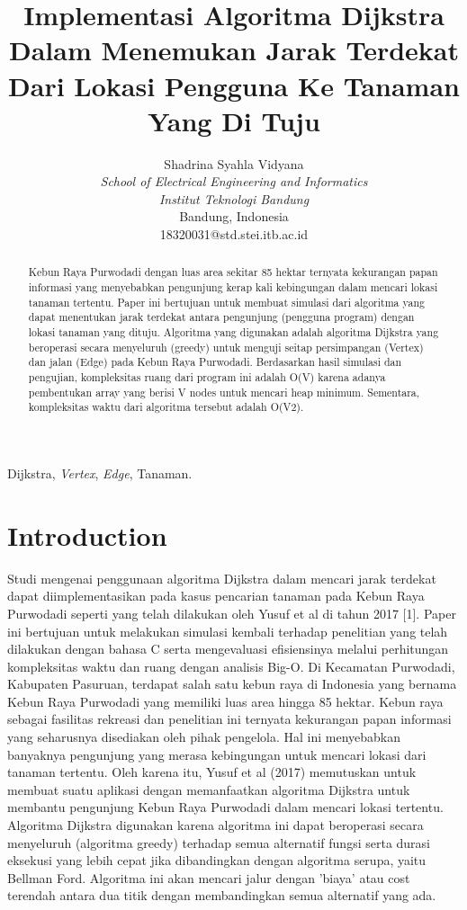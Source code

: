 \documentclass[10pt]{IEEEtran}
\title{Implementasi Algoritma Dijkstra Dalam
Menemukan Jarak Terdekat Dari Lokasi Pengguna
Ke Tanaman Yang Di Tuju}
\author{Shadrina Syahla Vidyana\\
        \small \emph{School of Electrical Engineering and Informatics}\\
        \small \emph{Institut Teknologi Bandung}\\
        \small Bandung, Indonesia\\
        \small 18320031@std.stei.itb.ac.id
}
\begin{document}
\maketitle
\begin{abstract}
    Kebun Raya Purwodadi dengan luas area sekitar 85
    hektar ternyata kekurangan papan informasi yang menyebabkan
    pengunjung kerap kali kebingungan dalam mencari lokasi tanaman tertentu. Paper ini bertujuan untuk membuat simulasi
    dari algoritma yang dapat menentukan jarak terdekat antara
    pengunjung (pengguna program) dengan lokasi tanaman yang
    dituju. Algoritma yang digunakan adalah algoritma Dijkstra
    yang beroperasi secara menyeluruh (greedy) untuk menguji
    seitap persimpangan (Vertex) dan jalan (Edge) pada Kebun
    Raya Purwodadi. Berdasarkan hasil simulasi dan pengujian,
    kompleksitas ruang dari program ini adalah O(V) karena adanya
    pembentukan array yang berisi V nodes untuk mencari heap minimum. Sementara, kompleksitas waktu dari algoritma tersebut adalah O(V2).
\end{abstract}

\begin{IEEEkeywords}
Dijkstra, \emph{Vertex}, \emph{Edge}, Tanaman.
\end{IEEEkeywords}

\section{Introduction}
Studi mengenai penggunaan algoritma Dijkstra dalam mencari jarak terdekat dapat diimplementasikan pada kasus pencarian tanaman pada Kebun Raya Purwodadi seperti yang telah
dilakukan oleh Yusuf et al di tahun 2017 [1]. Paper ini bertujuan untuk melakukan simulasi kembali terhadap penelitian
yang telah dilakukan dengan bahasa C serta mengevaluasi
efisiensinya melalui perhitungan kompleksitas waktu dan ruang dengan analisis Big-O.
Di Kecamatan Purwodadi, Kabupaten Pasuruan, terdapat
salah satu kebun raya di Indonesia yang bernama Kebun
Raya Purwodadi yang memiliki luas area hingga 85 hektar.
Kebun raya sebagai fasilitas rekreasi dan penelitian ini ternyata
kekurangan papan informasi yang seharusnya disediakan oleh
pihak pengelola. Hal ini menyebabkan banyaknya pengunjung
yang merasa kebingungan untuk mencari lokasi dari tanaman
tertentu. Oleh karena itu, Yusuf et al (2017) memutuskan
untuk membuat suatu aplikasi dengan memanfaatkan algoritma
Dijkstra untuk membantu pengunjung Kebun Raya Purwodadi
dalam mencari lokasi tertentu.
Algoritma Dijkstra digunakan karena algoritma ini dapat
beroperasi secara menyeluruh (algoritma greedy) terhadap
semua alternatif fungsi serta durasi eksekusi yang lebih cepat
jika dibandingkan dengan algoritma serupa, yaitu Bellman Ford. Algoritma ini akan mencari jalur dengan ’biaya’ atau
cost terendah antara dua titik dengan membandingkan semua
alternatif yang ada.\\
\end{document}
